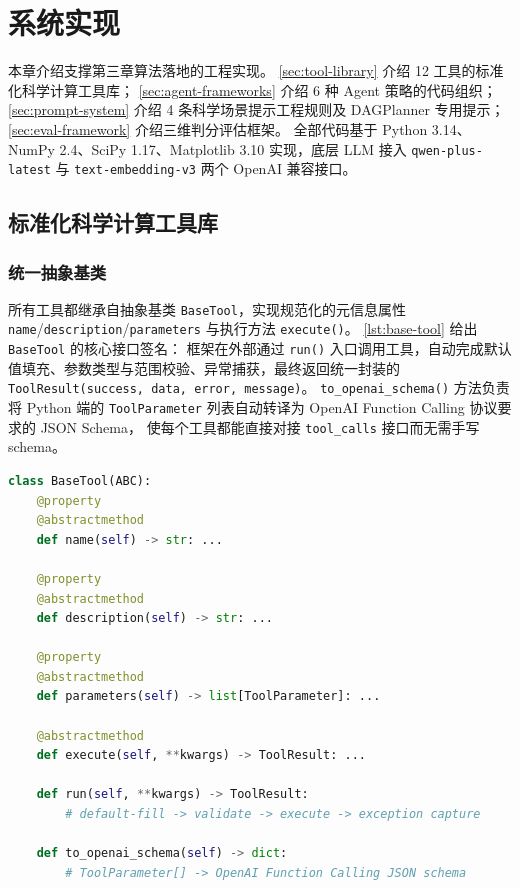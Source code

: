 \clearpage

\section{系统实现}

本章介绍支撑第三章算法落地的工程实现。
\autoref{sec:tool-library} 介绍 12 工具的标准化科学计算工具库；
\autoref{sec:agent-frameworks} 介绍 6 种 Agent 策略的代码组织；
\autoref{sec:prompt-system} 介绍 4 条科学场景提示工程规则及 DAGPlanner 专用提示；
\autoref{sec:eval-framework} 介绍三维判分评估框架。
全部代码基于 Python 3.14、NumPy 2.4、SciPy 1.17、Matplotlib 3.10 实现，底层 LLM 接入 \texttt{qwen-plus-latest} 与 \texttt{text-embedding-v3} 两个 OpenAI 兼容接口。

\subsection{标准化科学计算工具库}\label{sec:tool-library}

\subsubsection{统一抽象基类}

所有工具都继承自抽象基类 \texttt{BaseTool}，实现规范化的元信息属性 \texttt{name}/\allowbreak\texttt{description}/\allowbreak\texttt{parameters} 与执行方法 \texttt{execute()}。
\autoref{lst:base-tool} 给出 \texttt{BaseTool} 的核心接口签名：
框架在外部通过 \texttt{run()} 入口调用工具，自动完成默认值填充、参数类型与范围校验、异常捕获，最终返回统一封装的 \texttt{ToolResult(success, data, error, message)}。
\texttt{to\_openai\_schema()} 方法负责将 Python 端的 \texttt{ToolParameter} 列表自动转译为 OpenAI Function Calling 协议要求的 JSON Schema，
使每个工具都能直接对接 \texttt{tool\_calls} 接口而无需手写 schema。

\begin{lstlisting}[language=Python,
    caption={\texttt{BaseTool} 抽象基类的核心接口签名（节选）},
    label={lst:base-tool},
    basicstyle=\small\ttfamily,
    columns=flexible,
    breaklines=true,
    showstringspaces=false]
class BaseTool(ABC):
    @property
    @abstractmethod
    def name(self) -> str: ...

    @property
    @abstractmethod
    def description(self) -> str: ...

    @property
    @abstractmethod
    def parameters(self) -> list[ToolParameter]: ...

    @abstractmethod
    def execute(self, **kwargs) -> ToolResult: ...

    def run(self, **kwargs) -> ToolResult:
        # default-fill -> validate -> execute -> exception capture

    def to_openai_schema(self) -> dict:
        # ToolParameter[] -> OpenAI Function Calling JSON schema
\end{lstlisting}

